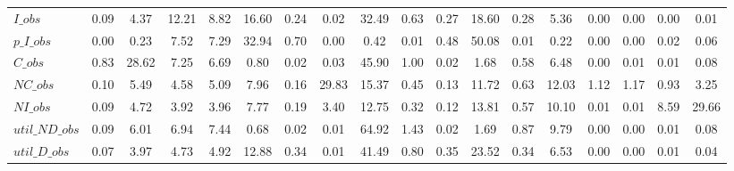 \begin{center}
\begin{longtable}{lccccccccccccccccc}
$I\_obs         $	 & 	            0.09	 & 	            4.37	 & 	           12.21	 & 	            8.82	 & 	           16.60	 & 	            0.24	 & 	            0.02	 & 	           32.49	 & 	            0.63	 & 	            0.27	 & 	           18.60	 & 	            0.28	 & 	            5.36	 & 	            0.00	 & 	            0.00	 & 	            0.00	 & 	            0.01 \\ 
$p\_I\_obs      $	 & 	            0.00	 & 	            0.23	 & 	            7.52	 & 	            7.29	 & 	           32.94	 & 	            0.70	 & 	            0.00	 & 	            0.42	 & 	            0.01	 & 	            0.48	 & 	           50.08	 & 	            0.01	 & 	            0.22	 & 	            0.00	 & 	            0.00	 & 	            0.02	 & 	            0.06 \\ 
$C\_obs         $	 & 	            0.83	 & 	           28.62	 & 	            7.25	 & 	            6.69	 & 	            0.80	 & 	            0.02	 & 	            0.03	 & 	           45.90	 & 	            1.00	 & 	            0.02	 & 	            1.68	 & 	            0.58	 & 	            6.48	 & 	            0.00	 & 	            0.01	 & 	            0.01	 & 	            0.08 \\ 
$NC\_obs        $	 & 	            0.10	 & 	            5.49	 & 	            4.58	 & 	            5.09	 & 	            7.96	 & 	            0.16	 & 	           29.83	 & 	           15.37	 & 	            0.45	 & 	            0.13	 & 	           11.72	 & 	            0.63	 & 	           12.03	 & 	            1.12	 & 	            1.17	 & 	            0.93	 & 	            3.25 \\ 
$NI\_obs        $	 & 	            0.09	 & 	            4.72	 & 	            3.92	 & 	            3.96	 & 	            7.77	 & 	            0.19	 & 	            3.40	 & 	           12.75	 & 	            0.32	 & 	            0.12	 & 	           13.81	 & 	            0.57	 & 	           10.10	 & 	            0.01	 & 	            0.01	 & 	            8.59	 & 	           29.66 \\ 
$util\_ND\_obs  $	 & 	            0.09	 & 	            6.01	 & 	            6.94	 & 	            7.44	 & 	            0.68	 & 	            0.02	 & 	            0.01	 & 	           64.92	 & 	            1.43	 & 	            0.02	 & 	            1.69	 & 	            0.87	 & 	            9.79	 & 	            0.00	 & 	            0.00	 & 	            0.01	 & 	            0.08 \\ 
$util\_D\_obs   $	 & 	            0.07	 & 	            3.97	 & 	            4.73	 & 	            4.92	 & 	           12.88	 & 	            0.34	 & 	            0.01	 & 	           41.49	 & 	            0.80	 & 	            0.35	 & 	           23.52	 & 	            0.34	 & 	            6.53	 & 	            0.00	 & 	            0.00	 & 	            0.01	 & 	            0.04 \\ 

\end{longtable}
\end{center}
